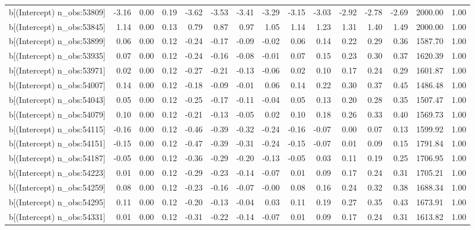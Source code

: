 \begin{table}[ht]
\begin{tabular}{rrrrrrrrrrrrrrr}
  b[(Intercept) n\_obs:53809] & -3.16 & 0.00 & 0.19 & -3.62 & -3.53 & -3.41 & -3.29 & -3.15 & -3.03 & -2.92 & -2.78 & -2.69 & 2000.00 & 1.00 \\ 
  b[(Intercept) n\_obs:53845] & 1.14 & 0.00 & 0.13 & 0.79 & 0.87 & 0.97 & 1.05 & 1.14 & 1.23 & 1.31 & 1.40 & 1.49 & 2000.00 & 1.00 \\ 
  b[(Intercept) n\_obs:53899] & 0.06 & 0.00 & 0.12 & -0.24 & -0.17 & -0.09 & -0.02 & 0.06 & 0.14 & 0.22 & 0.29 & 0.36 & 1587.70 & 1.00 \\ 
  b[(Intercept) n\_obs:53935] & 0.07 & 0.00 & 0.12 & -0.24 & -0.16 & -0.08 & -0.01 & 0.07 & 0.15 & 0.23 & 0.30 & 0.37 & 1620.39 & 1.00 \\ 
  b[(Intercept) n\_obs:53971] & 0.02 & 0.00 & 0.12 & -0.27 & -0.21 & -0.13 & -0.06 & 0.02 & 0.10 & 0.17 & 0.24 & 0.29 & 1601.87 & 1.00 \\ 
  b[(Intercept) n\_obs:54007] & 0.14 & 0.00 & 0.12 & -0.18 & -0.09 & -0.01 & 0.06 & 0.14 & 0.22 & 0.30 & 0.37 & 0.45 & 1486.48 & 1.00 \\ 
  b[(Intercept) n\_obs:54043] & 0.05 & 0.00 & 0.12 & -0.25 & -0.17 & -0.11 & -0.04 & 0.05 & 0.13 & 0.20 & 0.28 & 0.35 & 1507.47 & 1.00 \\ 
  b[(Intercept) n\_obs:54079] & 0.10 & 0.00 & 0.12 & -0.21 & -0.13 & -0.05 & 0.02 & 0.10 & 0.18 & 0.26 & 0.33 & 0.40 & 1569.73 & 1.00 \\ 
  b[(Intercept) n\_obs:54115] & -0.16 & 0.00 & 0.12 & -0.46 & -0.39 & -0.32 & -0.24 & -0.16 & -0.07 & 0.00 & 0.07 & 0.13 & 1599.92 & 1.00 \\ 
  b[(Intercept) n\_obs:54151] & -0.15 & 0.00 & 0.12 & -0.47 & -0.39 & -0.31 & -0.24 & -0.15 & -0.07 & 0.01 & 0.09 & 0.15 & 1791.84 & 1.00 \\ 
  b[(Intercept) n\_obs:54187] & -0.05 & 0.00 & 0.12 & -0.36 & -0.29 & -0.20 & -0.13 & -0.05 & 0.03 & 0.11 & 0.19 & 0.25 & 1706.95 & 1.00 \\ 
  b[(Intercept) n\_obs:54223] & 0.01 & 0.00 & 0.12 & -0.29 & -0.23 & -0.14 & -0.07 & 0.01 & 0.09 & 0.17 & 0.24 & 0.31 & 1705.21 & 1.00 \\ 
  b[(Intercept) n\_obs:54259] & 0.08 & 0.00 & 0.12 & -0.23 & -0.16 & -0.07 & -0.00 & 0.08 & 0.16 & 0.24 & 0.32 & 0.38 & 1688.34 & 1.00 \\ 
  b[(Intercept) n\_obs:54295] & 0.11 & 0.00 & 0.12 & -0.20 & -0.13 & -0.04 & 0.03 & 0.11 & 0.19 & 0.27 & 0.35 & 0.43 & 1673.91 & 1.00 \\ 
  b[(Intercept) n\_obs:54331] & 0.01 & 0.00 & 0.12 & -0.31 & -0.22 & -0.14 & -0.07 & 0.01 & 0.09 & 0.17 & 0.24 & 0.31 & 1613.82 & 1.00 \\ 

\end{tabular}
\end{table}
